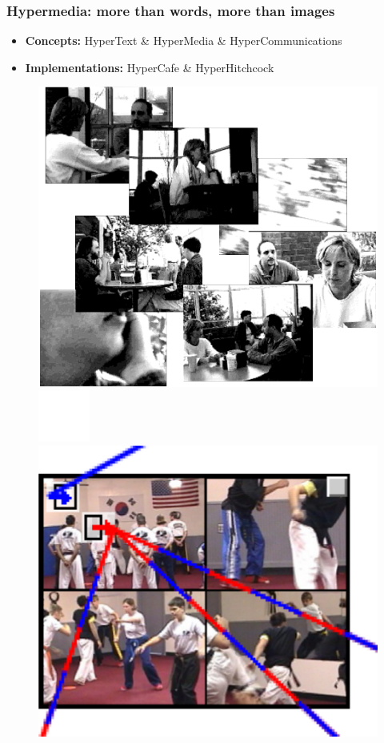 \documentclass[compress]{beamer}
\begin{document}
  		\begin{frame}[c]
		\frametitle{Hypermedia: more than words, more than images}
		\begin{itemize}
		\item \textbf{Concepts:} HyperText \& HyperMedia \& HyperCommunications
		\vfill
		\item \textbf{Implementations:} HyperCafe \& HyperHitchcock  %
				
		\end{itemize}
		
		\begin{figure}
			\includegraphics[height=0.4\textheight]{figures/hypercafe.png}
						\includegraphics[height=0.1\textheight]{figures/space.png}
			\includegraphics[height=0.4\textheight]{figures/hitchcock.png}
		\end{figure}
		\end{frame}
\end{document}
